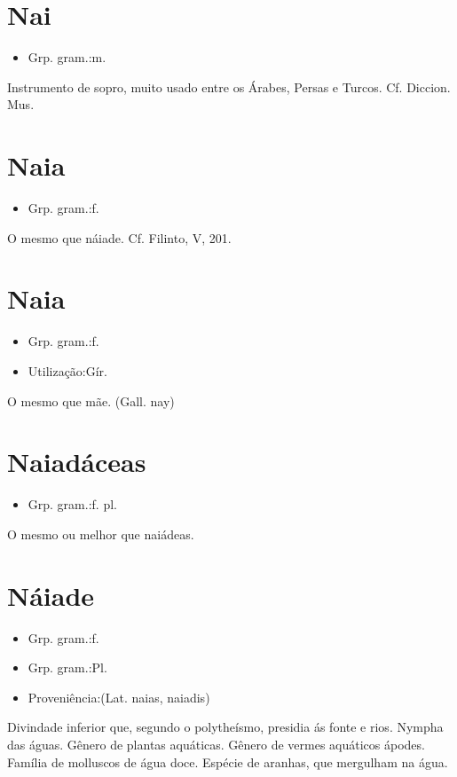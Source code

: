 \section{Nai}
\begin{itemize}
\item {Grp. gram.:m.}
\end{itemize}
Instrumento de sopro, muito usado entre os Árabes, Persas e Turcos. Cf. \textunderscore Diccion. Mus.\textunderscore 
\section{Naia}
\begin{itemize}
\item {Grp. gram.:f.}
\end{itemize}
O mesmo que \textunderscore náiade\textunderscore . Cf. Filinto, V, 201.
\section{Naia}
\begin{itemize}
\item {Grp. gram.:f.}
\end{itemize}
\begin{itemize}
\item {Utilização:Gír.}
\end{itemize}
O mesmo que \textunderscore mãe\textunderscore .
(Gall. \textunderscore nay\textunderscore )
\section{Naiadáceas}
\begin{itemize}
\item {Grp. gram.:f. pl.}
\end{itemize}
O mesmo ou melhor que \textunderscore naiádeas\textunderscore .
\section{Náiade}
\begin{itemize}
\item {Grp. gram.:f.}
\end{itemize}
\begin{itemize}
\item {Grp. gram.:Pl.}
\end{itemize}
\begin{itemize}
\item {Proveniência:(Lat. \textunderscore naias\textunderscore , \textunderscore naiadis\textunderscore )}
\end{itemize}
Divindade inferior que, segundo o polytheísmo, presidia ás fonte e rios.
Nympha das águas.
Gênero de plantas aquáticas.
Gênero de vermes aquáticos ápodes.
Família de molluscos de água doce.
Espécie de aranhas, que mergulham na água.
